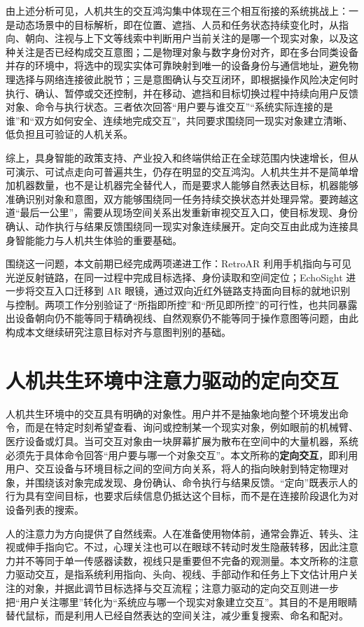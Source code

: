 由上述分析可见，人机共生的交互鸿沟集中体现在三个相互衔接的系统挑战上：一是动态场景中的目标解析，即在位置、遮挡、人员和任务状态持续变化时，从指向、朝向、注视与上下文等线索中判断用户当前关注的是哪一个现实对象，以及这种关注是否已经构成交互意图；二是物理对象与数字身份对齐，即在多台同类设备并存的环境中，将选中的现实实体可靠映射到唯一的设备身份与通信地址，避免物理选择与网络连接彼此脱节；三是意图确认与交互闭环，即根据操作风险决定何时执行、确认、暂停或交还控制，并在移动、遮挡和目标切换过程中持续向用户反馈对象、命令与执行状态。三者依次回答“用户要与谁交互”“系统实际连接的是谁”和“双方如何安全、连续地完成交互”，共同要求围绕同一现实对象建立清晰、低负担且可验证的人机关系。

综上，具身智能的政策支持、产业投入和终端供给正在全球范围内快速增长，但从可演示、可试点走向可普遍共生，仍存在明显的交互鸿沟。人机共生并不是简单增加机器数量，也不是让机器完全替代人，而是要求人能够自然表达目标，机器能够准确识别对象和意图，双方能够围绕同一任务持续交换状态并处理异常。要跨越这道“最后一公里”，需要从现场空间关系出发重新审视交互入口，使目标发现、身份确认、动作执行与结果反馈围绕同一现实对象连续展开。定向交互由此成为连接具身智能能力与人机共生体验的重要基础。

围绕这一问题，本文前期已经完成两项递进工作：RetroAR 利用手机指向与可见光逆反射链路，在同一过程中完成目标选择、身份读取和空间定位；EchoSight 进一步将交互入口迁移到 AR 眼镜，通过双向近红外链路支持面向目标的就地识别与控制。两项工作分别验证了“所指即所控”和“所见即所控”的可行性，也共同暴露出设备朝向仍不能等同于精确视线、自然观察仍不能等同于操作意图等问题，由此构成本文继续研究注意目标对齐与意图判别的基础。

\section{人机共生环境中注意力驱动的定向交互}
人机共生环境中的交互具有明确的对象性。用户并不是抽象地向整个环境发出命令，而是在特定时刻希望查看、询问或控制某一个现实对象，例如眼前的机械臂、医疗设备或灯具。当可交互对象由一块屏幕扩展为散布在空间中的大量机器，系统必须先于具体命令回答“用户要与哪一个对象交互”。本文所称的\textbf{定向交互}，即利用用户、交互设备与环境目标之间的空间方向关系，将人的指向映射到特定物理对象，并围绕该对象完成发现、身份确认、命令执行与结果反馈。“定向”既表示人的行为具有空间目标，也要求后续信息仍抵达这个目标，而不是在连接阶段退化为对设备列表的搜索。

人的注意力为方向提供了自然线索。人在准备使用物体前，通常会靠近、转头、注视或伸手指向它。不过，心理关注也可以在眼球不转动时发生隐蔽转移，因此注意力并不等同于单一传感器读数，视线只是重要但不完备的观测量\supercite{posner_attention}。本文所称的注意力驱动交互，是指系统利用指向、头向、视线、手部动作和任务上下文估计用户关注的对象，并据此调节目标选择与交互流程；注意力驱动的定向交互则进一步把“用户关注哪里”转化为“系统应与哪一个现实对象建立交互”。其目的不是用眼睛替代鼠标，而是利用人已经自然表达的空间关注，减少重复搜索、命名和配对。

